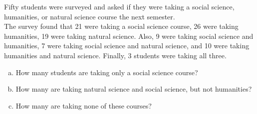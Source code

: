 \begin{try}
Fifty students were surveyed and asked if they were taking a social science, humanities, or natural science course the next semester.\\

The survey found that 21 were taking a social science course, 26 were taking humanities, 19 were taking natural science.  Also, 9 were taking social science and humanities, 7 were taking social science and natural science, and 10 were taking humanities and natural science.  Finally, 3 students were taking all three.

\begin{enumerate}[(a)]
\item How many students are taking only a social science course?
\item How many are taking natural science and social science, but not humanities?
\item How many are taking none of these courses?
\end{enumerate}
\end{try}

